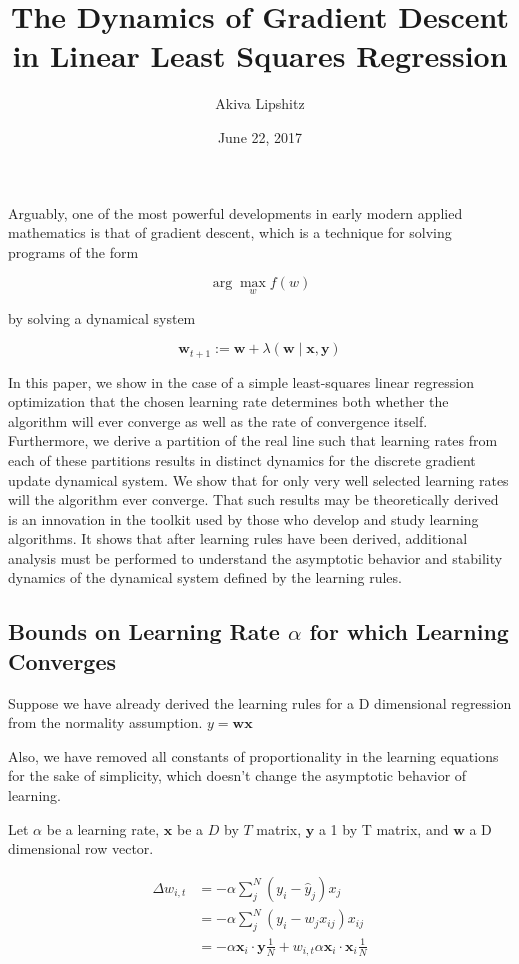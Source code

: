 \documentclass[]{article}
\title{The Dynamics of Gradient Descent in Linear Least Squares Regression}
\author{Akiva Lipshitz}
\date{June 22, 2017}
\begin{document}
\maketitle

Arguably, one of the most powerful developments in early modern applied
mathematics is that of gradient descent, which is a technique for
solving programs of the form

\[
\arg\max _w f(w)
\]

by solving a dynamical system

\[
\mathbf{w}_{t+1} := \mathbf{w}+\lambda(\mathbf{w}\mid \mathbf{x}, \mathbf{y})
\]

In this paper,  we show in the case of a simple least-squares linear regression optimization that the chosen learning rate determines both whether the algorithm will ever converge as well as the rate of convergence itself. Furthermore, we derive a partition of the real line such that learning rates from each of these partitions results in distinct dynamics for the discrete gradient update dynamical system. We show that for only very well selected learning rates will the algorithm ever converge. That such results may be theoretically derived is an innovation in the toolkit used by those who develop and study learning algorithms. It shows that after learning rules have been derived, additional analysis must be performed to understand the asymptotic behavior and stability dynamics of the dynamical system defined by the learning rules.

\subsection{Bounds on Learning Rate \(\alpha\) for which Learning Converges}

Suppose we have already derived the learning rules for a D dimensional
regression from the normality assumption. \(y = \mathbf{w} \mathbf{x}\)

Also, we have removed all constants of proportionality in the learning
equations for the sake of simplicity, which doesn't change the
asymptotic behavior of learning.

Let \(\alpha\) be a learning rate, \(\mathbf{x}\) be a \(D\) by \(T\)
matrix, \(\mathbf{y}\) a 1 by T matrix, and \(\mathbf{w}\) a D
dimensional row vector.

\begin{align}
\Delta w_{i,t} &= -\alpha \sum\limits^N_j (y_i-\hat{y}_j)x_j \\
&= -\alpha \sum\limits^N_j (y_i-w_jx_{ij})x_{ij}\\
&= -\alpha \mathbf{x}_i\cdot\mathbf{y}\frac{1}{N} + w_{i,t}\alpha \mathbf{x}_i\cdot\mathbf{x}_i\frac{1}{N}
\end{align}
\end{document}
